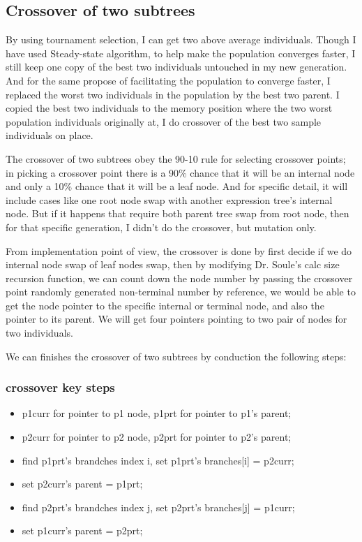 \documentclass[10pt,b5paper]{article}
\begin{document}
\subsection{Crossover of two subtrees}
\label{sec-1-3}
By using tournament selection, I can get two above average individuals. Though I have used Steady-state algorithm, to help make the population converges faster, I still keep one copy of the best two individuals untouched in my new generation. And for the same propose of facilitating the population to converge faster, I replaced the worst two individuals in the population by the best two parent. I copied the best two individuals to the memory position where the two worst population individuals originally at, I do crossover of the best two sample individuals on place.

The crossover of two subtrees obey the 90-10 rule for selecting crossover points; in picking a crossover point there is a 90\% chance that it will be an internal node and only a 10\% chance that it will be a leaf node. And for specific detail, it will include cases like one root node swap with another expression tree's internal node. But if it happens that require both parent tree swap from root node, then for that specific generation, I didn't do the crossover, but mutation only. 

From implementation point of view, the crossover is done by first decide if we do internal node swap of leaf nodes swap, then by modifying Dr. Soule's calc size recursion function, we can count down the node number by passing the crossover point randomly generated non-terminal number by reference, we would be able to get the node pointer to the specific internal or terminal node, and also the pointer to its parent. We will get four pointers pointing to two pair of nodes for two individuals. 

We can finishes the crossover of two subtrees by conduction the following steps: 
\subsubsection{crossover key steps}
\label{sec-1-3-1}
\begin{itemize}
\item p1curr for pointer to p1 node, p1prt for pointer to p1's parent;
\item p2curr for pointer to p2 node, p2prt for pointer to p2's parent;
\item find p1prt's brandches index i, set p1prt's branches[i] = p2curr;
\item set p2curr's parent = p1prt;
\item find p2prt's brandches index j, set p2prt's branches[j] = p1curr;
\item set p1curr's parent = p2prt;
\end{itemize}
\end{document}

